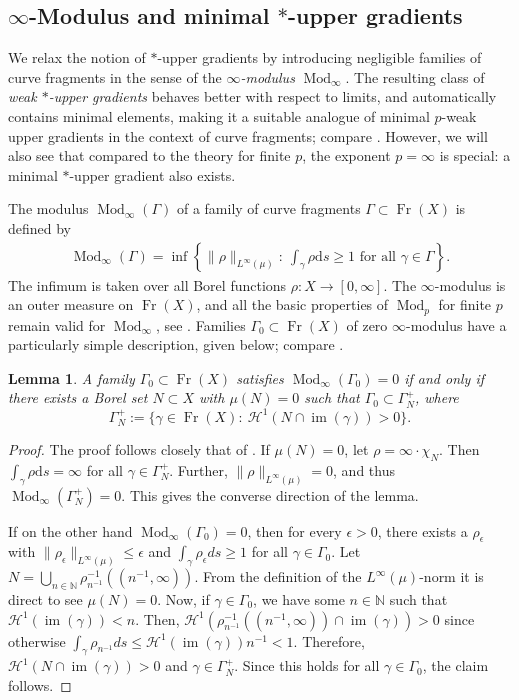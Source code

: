 \documentclass{amsart}
\newtheorem{lemma}[theorem]{Lemma}
\numberwithin{equation}{section}
\newcommand{\N}{\mathbb{N}}
\newcommand{\Ha}{\mathcal{H}}
\newcommand{\Mod}{\operatorname{Mod}}
\newcommand{\im}{\operatorname{im}}
\newcommand{\Fr}{\operatorname{Fr}}
\newcommand{\ud}{\mathrm {d}}
\begin{document}
\subsection{$\infty$-Modulus and minimal $\ast$-upper gradients}

We relax the notion of $\ast$-upper gradients by introducing negligible families of curve fragments in the sense of the \emph{$\infty$-modulus} $\Mod_\infty$. The resulting class of \emph{weak $\ast$-upper gradients} behaves better with respect to limits, and automatically contains minimal elements, making it a suitable analogue of minimal $p$-weak upper gradients in the context of curve fragments; compare \cite{HKST07,bjo11}. However, we will also see that compared to the theory for finite $p$, the exponent $p=\infty$ is special: a minimal $\ast$-upper gradient also exists.

The modulus $\Mod_\infty(\Gamma)$ of a family of curve fragments $\Gamma\subset \Fr(X)$ is defined by
\begin{align}
\Mod_\infty(\Gamma)=\inf\left\{\|\rho\|_{L^\infty(\mu)}:\ \int_\gamma\rho\ud s\ge 1\textrm{ for all }\gamma\in\Gamma \right\}.
\end{align}
The infimum is taken over all Borel functions $\rho:X\to [0,\infty]$. The $\infty$-modulus is an outer measure on $\Fr(X)$, and all the basic properties of $\Mod_p$ for finite $p$ remain valid for $\Mod_\infty$, see \cite{car-jar10}. Families $\Gamma_0\subset \Fr(X)$ of zero $\infty$-modulus have a particularly simple description, given below; compare \cite[Lemma 5.7]{car-jar10}.
\begin{lemma}\label{lem:Nexistence}
A family $\Gamma_0\subset \Fr(X)$ satisfies $\Mod_\infty(\Gamma_0)=0$ if and only if there exists a Borel set $N\subset X$ with $\mu(N)=0$ such that $\Gamma_0\subset \Gamma_N^+$, where 
\[
\Gamma_N^+:=\{\gamma\in\Fr(X):\ \Ha^1(N\cap \im(\gamma))>0\}.
\]
\end{lemma}
\begin{proof}
    The proof follows closely that of \cite[Lemma 5.7]{car-jar10}. If $\mu(N)=0$, let $\rho=\infty \cdot \chi_N$. Then $\int_\gamma \rho \ud s= \infty$ for all $\gamma\in \Gamma_N^+$. Further, $\|\rho\|_{L^\infty(\mu)}=0$, and thus $\Mod_\infty(\Gamma_N^+)=0$. This gives the converse direction of the lemma.

    If on the other hand $\Mod_\infty(\Gamma_0)=0$, then for every $\epsilon>0$, there exists a $\rho_\epsilon$ with $\|\rho_\epsilon\|_{L^\infty(\mu)}\leq \epsilon$ and $\int_\gamma \rho_\epsilon ds\geq 1$ for all $\gamma \in \Gamma_0$. Let $N = \bigcup_{n\in \N} \rho_{n^{-1}}^{-1}((n^{-1},\infty))$. From the definition of the $L^\infty(\mu)$-norm it is direct to see $\mu(N)=0$. Now, if $\gamma \in \Gamma_0$, we have some $n\in \N$ such that $\Ha^1(\im(\gamma))< n$. Then, $\Ha^1(\rho_{n^{-1}}^{-1}((n^{-1},\infty))\cap \im(\gamma))>0$ since otherwise $\int_\gamma \rho_{n^{-1}} ds \leq \Ha^1(\im(\gamma)) n^{-1} < 1$. Therefore, $\Ha^1(N\cap \im(\gamma))>0$ and $\gamma\in \Gamma_N^+$. Since this holds for all $\gamma\in \Gamma_0$, the claim follows.
\end{proof}
\end{document}
